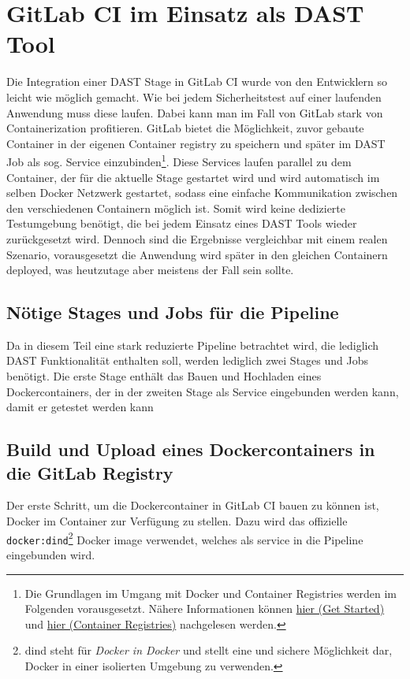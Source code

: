 \section{GitLab CI im Einsatz als DAST Tool}\label{sec:gitlab-ci-im-einsatz-als-dast-tool}

Die Integration einer DAST Stage in GitLab CI wurde von den Entwicklern so leicht wie möglich gemacht.
Wie bei jedem Sicherheitstest auf einer laufenden Anwendung muss diese laufen.
Dabei kann man im Fall von GitLab stark von Containerization profitieren.
GitLab bietet die Möglichkeit, zuvor gebaute Container in der eigenen Container registry zu speichern und später im DAST Job als sog. Service einzubinden\footnote{Die Grundlagen im Umgang mit Docker und Container Registries werden im Folgenden vorausgesetzt. Nähere Informationen können \href{https://docs.docker.com/get-started/}{hier (Get Started)} und \href{https://docs.docker.com/registry/}{hier (Container Registries)} nachgelesen werden.}.
Diese Services laufen parallel zu dem Container, der für die aktuelle Stage gestartet wird und wird automatisch im selben Docker Netzwerk gestartet, sodass eine einfache Kommunikation zwischen den verschiedenen Containern möglich ist.
Somit wird keine dedizierte Testumgebung benötigt, die bei jedem Einsatz eines DAST Tools wieder zurückgesetzt wird.
Dennoch sind die Ergebnisse vergleichbar mit einem realen Szenario, vorausgesetzt die Anwendung wird später in den gleichen Containern deployed, was heutzutage aber meistens der Fall sein sollte.

\subsection{Nötige Stages und Jobs für die Pipeline}

Da in diesem Teil eine stark reduzierte Pipeline betrachtet wird, die lediglich DAST Funktionalität enthalten soll, werden lediglich zwei Stages und Jobs benötigt.
Die erste Stage enthält das Bauen und Hochladen eines Dockercontainers, der in der zweiten Stage als Service eingebunden werden kann, damit er getestet werden kann

\subsection{Build und Upload eines Dockercontainers in die GitLab Registry}

Der erste Schritt, um die Dockercontainer in GitLab CI bauen zu können ist, Docker im Container zur Verfügung zu stellen.
Dazu wird das offizielle \texttt{docker:dind}\footnote{dind steht für \textit{Docker in Docker} und stellt eine und sichere Möglichkeit dar, Docker in einer isolierten Umgebung zu verwenden.} Docker image verwendet, welches als service in die Pipeline eingebunden wird.

